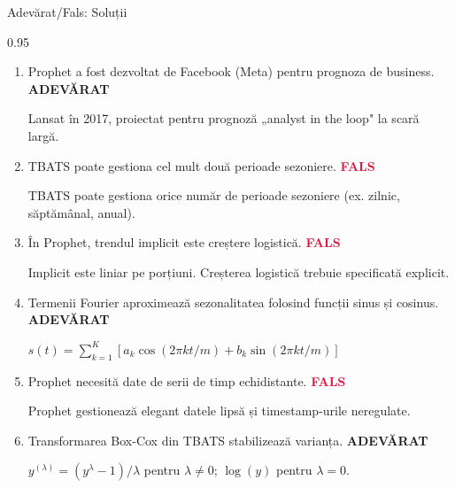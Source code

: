 \documentclass[9pt, aspectratio=169, t]{beamer}
\begin{document}
\begin{frame}{Adevărat/Fals: Soluții}
    \begin{cminipage}{0.95\textwidth}
    {\small
    \begin{enumerate}\setlength{\itemsep}{1pt}
        \item Prophet a fost dezvoltat de Facebook (Meta) pentru prognoza de business. \hfill \textcolor{Forest}{\textbf{ADEVĂRAT}}

        {\footnotesize \textcolor{MediumGray}{Lansat în 2017, proiectat pentru prognoză „analyst in the loop" la scară largă.}}

        \item TBATS poate gestiona cel mult două perioade sezoniere. \hfill \textcolor{Crimson}{\textbf{FALS}}

        {\footnotesize \textcolor{MediumGray}{TBATS poate gestiona orice număr de perioade sezoniere (ex. zilnic, săptămânal, anual).}}

        \item În Prophet, trendul implicit este creștere logistică. \hfill \textcolor{Crimson}{\textbf{FALS}}

        {\footnotesize \textcolor{MediumGray}{Implicit este liniar pe porțiuni. Creșterea logistică trebuie specificată explicit.}}

        \item Termenii Fourier aproximează sezonalitatea folosind funcții sinus și cosinus. \hfill \textcolor{Forest}{\textbf{ADEVĂRAT}}

        {\footnotesize \textcolor{MediumGray}{$s(t) = \sum_{k=1}^{K}[a_k \cos(2\pi kt/m) + b_k \sin(2\pi kt/m)]$}}

        \item Prophet necesită date de serii de timp echidistante. \hfill \textcolor{Crimson}{\textbf{FALS}}

        {\footnotesize \textcolor{MediumGray}{Prophet gestionează elegant datele lipsă și timestamp-urile neregulate.}}

        \item Transformarea Box-Cox din TBATS stabilizează varianța. \hfill \textcolor{Forest}{\textbf{ADEVĂRAT}}

        {\footnotesize \textcolor{MediumGray}{$y^{(\lambda)} = (y^\lambda - 1)/\lambda$ pentru $\lambda \neq 0$; $\log(y)$ pentru $\lambda = 0$.}}
    \end{enumerate}
    }
    \end{cminipage}
\end{frame}
\end{document}
